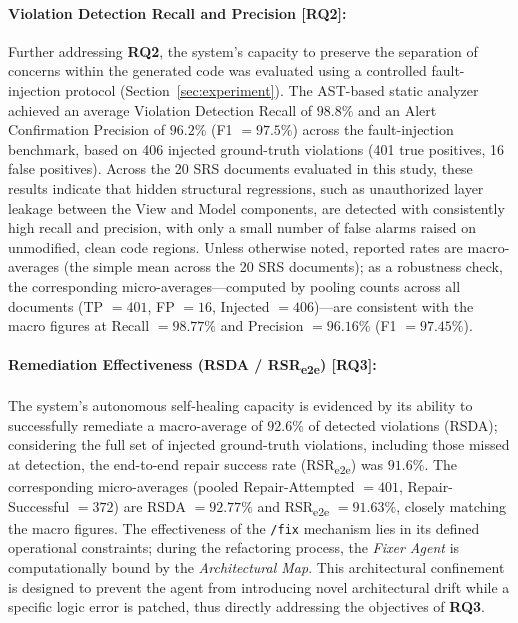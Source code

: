 \paragraph{Violation Detection Recall and Precision [RQ2]:}
Further addressing \textbf{RQ2}, the system's capacity to preserve the separation of concerns within the generated code was evaluated using a controlled fault-injection protocol (Section~\ref{sec:experiment}). The AST-based static analyzer achieved an average Violation Detection Recall of $98.8\%$ and an Alert Confirmation Precision of $96.2\%$ (F1 $= 97.5\%$) across the fault-injection benchmark, based on 406 injected ground-truth violations (401 true positives, 16 false positives). Across the 20 SRS documents evaluated in this study, these results indicate that hidden structural regressions, such as unauthorized layer leakage between the View and Model components, are detected with consistently high recall and precision, with only a small number of false alarms raised on unmodified, clean code regions. Unless otherwise noted, reported rates are macro-averages (the simple mean across the 20 SRS documents); as a robustness check, the corresponding micro-averages---computed by pooling counts across all documents (TP $=401$, FP $=16$, Injected $=406$)---are consistent with the macro figures at Recall $=98.77\%$ and Precision $=96.16\%$ (F1 $=97.45\%$).

\paragraph{Remediation Effectiveness (RSDA / RSR\textsubscript{e2e}) [RQ3]:}
The system's autonomous self-healing capacity is evidenced by its ability to successfully remediate a macro-average of $92.6\%$ of detected violations (RSDA); considering the full set of injected ground-truth violations, including those missed at detection, the end-to-end repair success rate (RSR\textsubscript{e2e}) was $91.6\%$. The corresponding micro-averages (pooled Repair-Attempted $=401$, Repair-Successful $=372$) are RSDA $=92.77\%$ and RSR\textsubscript{e2e} $=91.63\%$, closely matching the macro figures. The effectiveness of the \texttt{/fix} mechanism lies in its defined operational constraints; during the refactoring process, the \textit{Fixer Agent} is computationally bound by the \textit{Architectural Map}. This architectural confinement is designed to prevent the agent from introducing novel architectural drift while a specific logic error is patched, thus directly addressing the objectives of \textbf{RQ3}.

